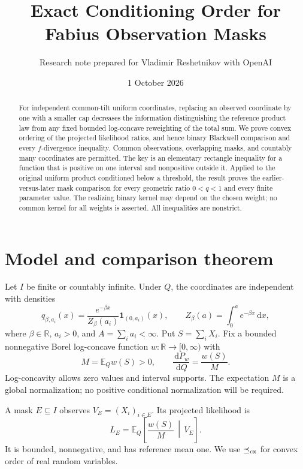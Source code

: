 \documentclass[11pt,a4paper]{article}
\title{Exact Conditioning Order for Fabius Observation Masks}
\author{Research note prepared for Vladimir Reshetnikov with OpenAI}
\date{1 October 2026}
\theoremstyle{remark}\newtheorem*{ednote}{Editorial note (ProveIt, 2026-10-01)}
\newcommand{\E}{\mathbb E}\newcommand{\R}{\mathbb R}\newcommand{\N}{\mathbb N}
\newcommand{\ind}{\mathbf1}\newcommand{\dd}{\,\mathrm d}
\begin{document}
\maketitle
\begin{abstract}
For independent common-tilt uniform coordinates, replacing an observed coordinate by one with a smaller cap decreases the information distinguishing the reference product law from any fixed bounded log-concave reweighting of the total sum. We prove convex ordering of the projected likelihood ratios, and hence binary Blackwell comparison and every $f$-divergence inequality. Common observations, overlapping masks, and countably many coordinates are permitted. The key is an elementary rectangle inequality for a function that is positive on one interval and nonpositive outside it. Applied to the original uniform product conditioned below a threshold, the result proves the earlier-versus-later mask comparison for every geometric ratio $0<q<1$ and every finite parameter value. The realizing binary kernel may depend on the chosen weight; no common kernel for all weights is asserted. All inequalities are nonstrict.
\end{abstract}

\section{Model and comparison theorem}
Let $I$ be finite or countably infinite. Under $Q$, the coordinates are independent with densities
\begin{equation}\label{eq:density}
 q_{\beta,a_i}(x)=\frac{e^{-\beta x}}{Z_\beta(a_i)}\ind_{(0,a_i)}(x),
 \qquad Z_\beta(a)=\int_0^a e^{-\beta x}\dd x,
\end{equation}
where $\beta\in\R$, $a_i>0$, and $A=\sum_i a_i<\infty$. Put $S=\sum_iX_i$. Fix a bounded nonnegative Borel log-concave function $w:\R\to[0,\infty)$ with
\begin{equation}\label{eq:weight}
 M=\E_Qw(S)>0,\qquad \frac{\dd P_w}{\dd Q}=\frac{w(S)}M.
\end{equation}
Log-concavity allows zero values and interval supports. The expectation $M$ is a global normalization; no positive conditional normalization will be required.

A mask $E\subseteq I$ observes $V_E=(X_i)_{i\in E}$. Its projected likelihood is
\begin{equation}\label{eq:likelihood}
 L_E=\E_Q\left[\frac{w(S)}M\,\middle|\,V_E\right].
\end{equation}
It is bounded, nonnegative, and has reference mean one. We use $\preceq_{\rm cx}$ for convex order of real random variables.
\end{document}
